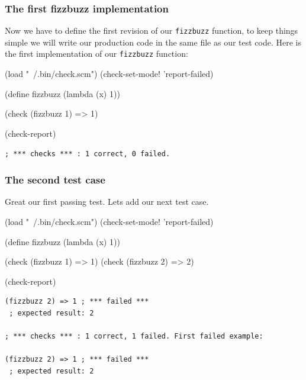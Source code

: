\documentclass[12pt,a4paper,english,twoside]{article}
\begin{document}
\subsubsection{The first fizzbuzz implementation}
Now we have to define the first revision of our \texttt{fizzbuzz} function, 
to keep things simple we will write our production code in the same file as 
our test code. Here is the first implementation of our \texttt{fizzbuzz} 
function:
\begin{schemecode}
(load "~/.bin/check.scm")
(check-set-mode! 'report-failed)

(define fizzbuzz (lambda (x) 1))

(check (fizzbuzz 1) => 1)

(check-report)
\end{schemecode}
\begin{lstlisting}
; *** checks *** : 1 correct, 0 failed.
\end{lstlisting}
\subsubsection{The second test case}
Great our first passing test. Lets add our next test case.  
\begin{schemecode}
(load "~/.bin/check.scm")
(check-set-mode! 'report-failed)

(define fizzbuzz (lambda (x) 1))

(check (fizzbuzz 1) => 1)
(check (fizzbuzz 2) => 2)

(check-report)
\end{schemecode}
\begin{lstlisting}
(fizzbuzz 2) => 1 ; *** failed ***
 ; expected result: 2

; *** checks *** : 1 correct, 1 failed. First failed example:

(fizzbuzz 2) => 1 ; *** failed ***
 ; expected result: 2
\end{lstlisting}
\end{document}
